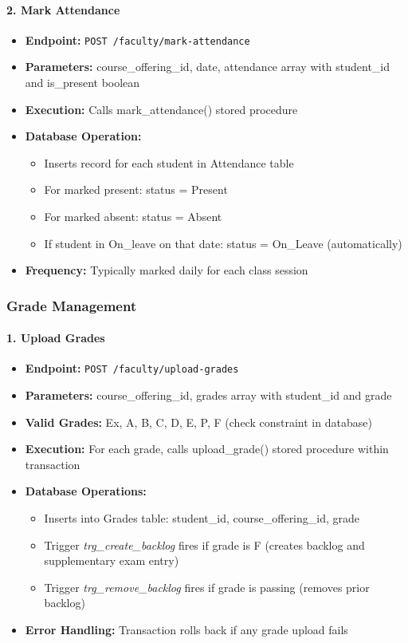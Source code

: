 \documentclass[12pt]{article}
\begin{document}
\paragraph{2. Mark Attendance}
\begin{itemize}
    \item \textbf{Endpoint:} \texttt{POST /faculty/mark-attendance}
    \item \textbf{Parameters:} course\_offering\_id, date, attendance array with student\_id and is\_present boolean
    \item \textbf{Execution:} Calls mark\_attendance() stored procedure
    \item \textbf{Database Operation:}
        \begin{itemize}
            \item Inserts record for each student in Attendance table
            \item For marked present: status = Present
            \item For marked absent: status = Absent
            \item If student in On\_leave on that date: status = On\_Leave (automatically)
        \end{itemize}
    \item \textbf{Frequency:} Typically marked daily for each class session
\end{itemize}

\subsubsection{Grade Management}

\paragraph{1. Upload Grades}
\begin{itemize}
    \item \textbf{Endpoint:} \texttt{POST /faculty/upload-grades}
    \item \textbf{Parameters:} course\_offering\_id, grades array with student\_id and grade
    \item \textbf{Valid Grades:} Ex, A, B, C, D, E, P, F (check constraint in database)
    \item \textbf{Execution:} For each grade, calls upload\_grade() stored procedure within transaction
    \item \textbf{Database Operations:}
        \begin{itemize}
            \item Inserts into Grades table: student\_id, course\_offering\_id, grade
            \item Trigger \textit{trg\_create\_backlog} fires if grade is F (creates backlog and supplementary exam entry)
            \item Trigger \textit{trg\_remove\_backlog} fires if grade is passing (removes prior backlog)
        \end{itemize}
    \item \textbf{Error Handling:} Transaction rolls back if any grade upload fails
\end{itemize}
\end{document}
